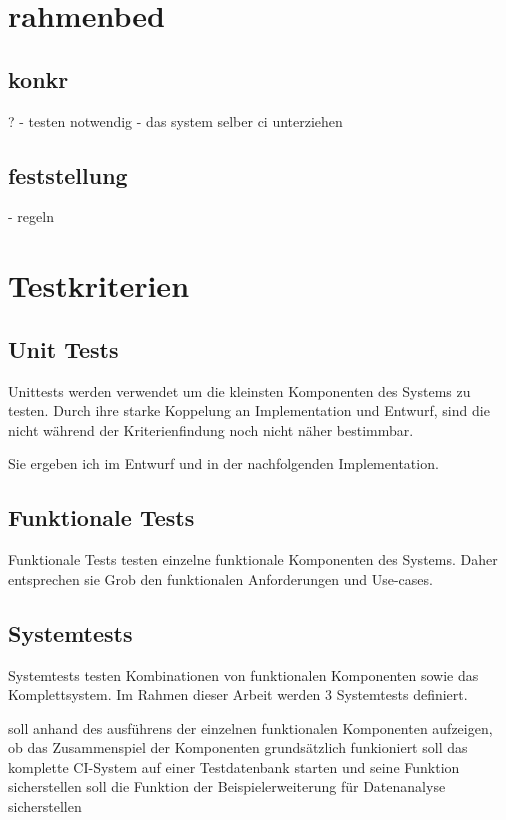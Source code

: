 \section{rahmenbed}

\subsection{konkr}?
- testen notwendig
- das system selber ci unterziehen

\subsection{feststellung}
 - regeln


\section{Testkriterien}
\subsection{Unit Tests}

Unittests werden verwendet um die kleinsten Komponenten des Systems zu testen.
Durch ihre starke Koppelung an Implementation und Entwurf,
sind die nicht w\"ahrend der Kriterienfindung noch nicht n\"aher bestimmbar.

Sie ergeben ich im Entwurf und in der nachfolgenden Implementation.

\subsection{Funktionale Tests}

Funktionale Tests testen einzelne funktionale Komponenten des Systems.
Daher entsprechen sie Grob den funktionalen Anforderungen und Use-cases.

\subsection{Systemtests}

Systemtests testen Kombinationen von funktionalen Komponenten sowie das Komplettsystem.
Im Rahmen dieser Arbeit werden 3 Systemtests definiert.


\begin{description}
  \dhitem[Komponentendurchlauf]
    soll anhand des ausf\"uhrens der einzelnen funktionalen Komponenten
    aufzeigen, ob das Zusammenspiel der Komponenten
    grunds\"atzlich funkioniert
  \dhitem[Komplettstystem]
    soll das komplette CI-System auf einer Testdatenbank starten
    und seine Funktion sicherstellen
    soll die Funktion der Beispielerweiterung f\"ur Datenanalyse sicherstellen
\end{description}

